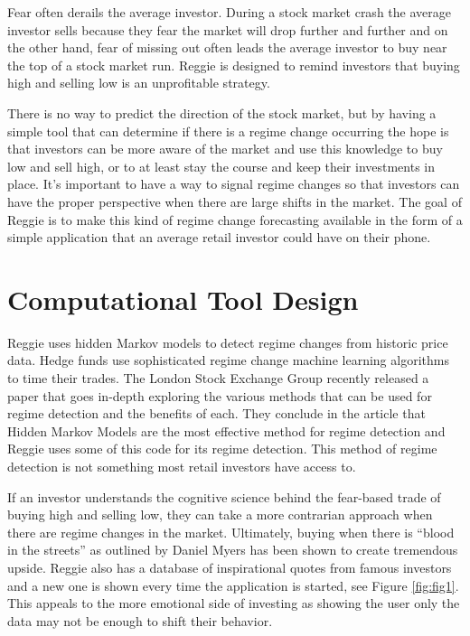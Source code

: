 \documentclass[conference]{IEEEtran}
\begin{document}
Fear often derails the average investor. During a stock market crash the average investor sells because they fear the market will drop further and further and on the other hand, fear of missing out often leads the average investor to buy near the top of a stock market run. Reggie is designed to remind investors that buying high and selling low is an unprofitable strategy. 

There is no way to predict the direction of the stock market, but by having a simple tool that can determine if there is a regime change occurring the hope is that investors can be more aware of the market and use this knowledge to buy low and sell high, or to at least stay the course and keep their investments in place. It's important to have a way to signal regime changes so that investors can have the proper perspective when there are large shifts in the market. The goal of Reggie is to make this kind of regime change forecasting available in the form of a simple application that an average retail investor could have on their phone.


\section{Computational Tool Design}

Reggie uses hidden Markov models to detect regime changes from historic price data. Hedge funds use sophisticated regime change machine learning algorithms to time their trades. The London Stock Exchange Group recently released a paper that goes in-depth exploring the various methods that can be used for regime detection and the benefits of each. \cite{b3} They conclude in the article that Hidden Markov Models are the most effective method for regime detection and Reggie uses some of this code for its regime detection. This method of regime detection is not something most retail investors have access to.

If an investor understands the cognitive science behind the fear-based trade of buying high and selling low, they can take a more contrarian approach when there are regime changes in the market. Ultimately, buying when there is ``blood in the streets'' as outlined by Daniel Myers has been shown to create tremendous upside. \cite{b2} Reggie also has a database of inspirational quotes from famous investors and a new one is shown every time the application is started, see Figure \ref{fig:fig1}. This appeals to the more emotional side of investing as showing the user only the data may not be enough to shift their behavior.
\end{document}
